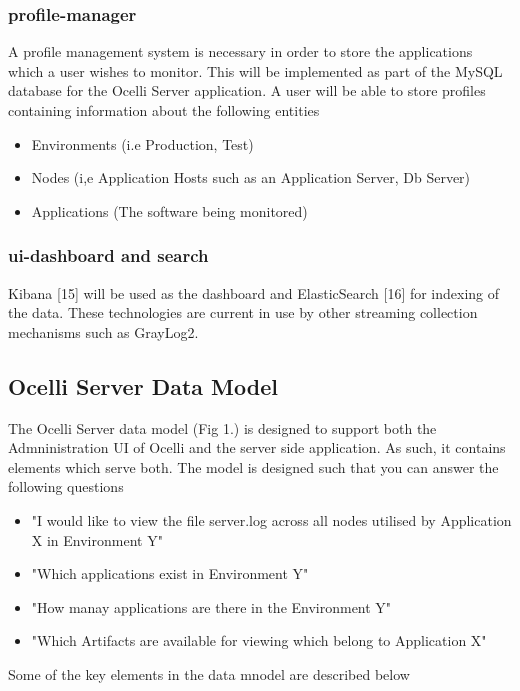 \documentclass{llncs}
\begin{document}
\subsubsection{profile-manager}
	
A profile management system is necessary in order to store the applications which a user wishes to monitor. This will be implemented as part of the MySQL database for the Ocelli Server application. A user will be able to store profiles containing information about the following entities

\begin{itemize}
\item	Environments (i.e Production, Test)
\item	Nodes (i,e Application Hosts such as an Application Server, Db Server)
\item	Applications (The software being monitored)
\end{itemize}
\subsubsection{ui-dashboard and search}

Kibana [15] will be used as the dashboard and ElasticSearch [16] for indexing of the data. These technologies are current in use by other streaming collection mechanisms such as GrayLog2. 

\subsection{Ocelli Server Data Model}

The Ocelli Server data model (Fig 1.) is designed to support both the Admninistration UI of Ocelli and the server side application. As such, it contains elements which serve both. The model is designed such that you can answer the following questions

\begin{itemize}
\item "I would like to view the file server.log across all nodes utilised by Application X in Environment Y"
\item "Which applications exist in Environment Y"
\item "How manay applications are there in the Environment Y"
\item "Which Artifacts are available for viewing which belong to Application X"
\end{itemize}

Some of the key elements in the data mnodel are described below
\end{document}

